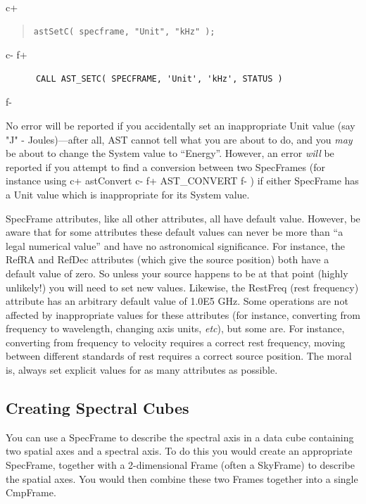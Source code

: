 \documentclass[twoside,11pt]{article}
\begin{document}
c+
\begin{quote}
\small
\begin{verbatim}
astSetC( specframe, "Unit", "kHz" );
\end{verbatim}
\normalsize
\end{quote}
c-
f+
\small
\begin{verbatim}
      CALL AST_SETC( SPECFRAME, 'Unit', 'kHz', STATUS )
\end{verbatim}
\normalsize
f-

No error will be reported if you accidentally set an inappropriate Unit value 
(say "J" - Joules)---after all, AST cannot tell what you are about to do,
and you \emph{may} be about to change the System value to ``Energy''.
However, an error \emph{will} be reported if you attempt to find a
conversion between two SpecFrames (for instance using 
c+
astConvert
c-
f+
AST\_CONVERT
f-
) if either SpecFrame has a Unit value which is inappropriate for its
System value.

SpecFrame attributes, like all other attributes, all have default
value. However, be aware that for some attributes these default values
can never be more than ``a legal numerical value'' and have no
astronomical significance. For instance, the RefRA and RefDec attributes
(which give the source position) both have a default value of zero. So
unless your source happens to be at that point (highly unlikely!) you will
need to set new values. Likewise, the RestFreq (rest frequency) attribute
has an arbitrary default value of 1.0E5 GHz. Some operations are not
affected by inappropriate values for these attributes (for instance,
converting from frequency to wavelength, changing axis units, \emph{etc}),
but some are. For instance, converting from frequency to velocity
requires a correct rest frequency, moving between different standards of
rest requires a correct source position. The moral is, always set explicit
values for as many attributes as possible.

\subsection{\label{ss:creatingspectralcubes}Creating Spectral Cubes}
You can use a SpecFrame to describe the spectral axis in a data cube
containing two spatial axes and a spectral axis. To do this you would
create an appropriate SpecFrame, together with a 2-dimensional Frame 
(often a SkyFrame) to describe the spatial axes. You would then combine
these two Frames together into a single CmpFrame.
\end{document}
